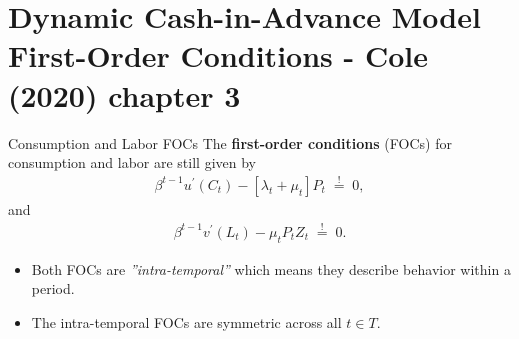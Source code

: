 \documentclass[10pt,c,aspectratio=1610,handout]{beamer}
\begin{document}
\section{Dynamic Cash-in-Advance Model\\\small{First-Order Conditions - Cole (2020) chapter 3}}%
\begin{frame}{Consumption and Labor FOCs}%
  The \textbf{first-order conditions} (FOCs) for consumption and labor are still given by%
  \begin{align}%
    \beta^{t-1} u^{\prime}(C_{t}) - \left[ \lambda_{t} + \mu_{t} \right] P_{t} \; \overset{!}{=} \; 0,\label{foc 2 C}%
  \end{align}%
  and%
  \begin{align}%
    \beta^{t-1}v^{\prime}(L_{t}) - \mu_{t} P_{t} Z_{t} \; \overset{!}{=} \; 0. \label{foc 2 L}%
  \end{align}%
  \pause%
  \begin{itemize}%
    \item[$\blacktriangleright$] Both FOCs are \emph{''intra-temporal''} which means they describe behavior within a period.%
    \item[$\blacktriangleright$] The intra-temporal FOCs are symmetric across all $t \in T$.%
  \end{itemize}%
\end{frame}%
\end{document}
